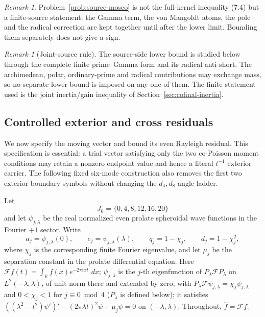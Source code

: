 \documentclass[11pt]{amsart}
\theoremstyle{definition}
\theoremstyle{remark}
\newtheorem{remark}[theorem]{Remark}
\newcommand{\R}{\mathbb R}
\newcommand{\dd}{\,d}
\begin{document}
\begin{remark}
Problem~\ref{prob:source-mosco} is not the full-kernel inequality (7.4)
but a finite-source statement: the Gamma term, the von Mangoldt atoms,
the pole and the radical correction are kept together until after the
lower limit.  Bounding them separately does not give a sign.
\end{remark}

\begin{remark}[Joint-source rule]
The source-side lower bound is studied below through the complete finite
prime--Gamma form and its radical anti-short.  The archimedean, polar,
ordinary-prime and radical contributions may exchange mass, so no
separate lower bound is imposed on any one of them.  The finite
statement used is the joint inertia/gain inequality of
Section~\ref{sec:cofinal-inertia}.
\end{remark}

\subsection{Controlled exterior and cross residuals}

We now specify the moving vector and bound its even Rayleigh residual.
This specification is essential: a trial
vector satisfying only the two co-Poisson moment conditions may retain a
nonzero endpoint value and hence a literal \(t^{-1}\) exterior carrier.
The following fixed six-mode construction also removes the first two
exterior boundary symbols without changing the \(d_4,d_8\) angle ladder.

Let
\[
 J_6=\{0,4,8,12,16,20\}
\]
and let \(\psi_{j,\lambda}\) be the real normalized even prolate
spheroidal wave functions in the Fourier \(+1\) sector.  Write
\[
 a_j=\psi_{j,\lambda}(0),\qquad
 e_j=\psi_{j,\lambda}(\lambda),\qquad
 q_j=1-\chi_j,\qquad d_j=1-\chi_j^2,
\tag{8.8a}
\]
where \(\chi_j\) is the corresponding finite Fourier eigenvalue, and let
\(\mu_j\) be the separation constant in the prolate differential equation.
Here \(\mathcal F f(t)=\int_\R f(x)e^{-2\pi ixt}\,\dd x\);
\(\psi_{j,\lambda}\) is the \(j\)-th eigenfunction of
\(P_\lambda\mathcal F P_\lambda\) on \(L^2(-\lambda,\lambda)\), of unit
norm there and extended by zero, with
\(P_\lambda\mathcal F\psi_{j,\lambda}=\chi_j\psi_{j,\lambda}\) and
\(0<\chi_j<1\) for \(j\equiv0\bmod4\) (\(P_\lambda\) is defined below);
it satisfies
\(((\lambda^2-t^2)\psi')'-(2\pi\lambda t)^2\psi+\mu_j\psi=0\) on
\((-\lambda,\lambda)\).  Throughout, \(\widehat f=\mathcal F f\).
\end{document}
